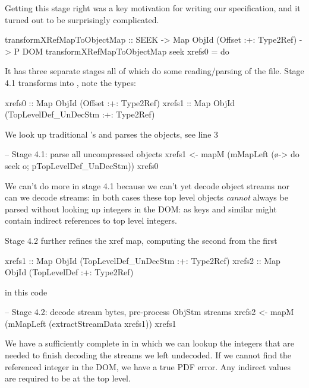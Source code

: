 Getting this stage right was a key motivation for writing our
specification, and it turned out to be surprisingly complicated.
\begin{code}
transformXRefMapToObjectMap
  :: SEEK -> Map ObjId (Offset :+: Type2Ref) -> P DOM
transformXRefMapToObjectMap seek xrefs0 = do
\end{code}
It has three separate stages all of which do some reading/parsing of
the file. Stage 4.1
transforms  into , note the types:
\begin{codeNoExecute}
  xrefs0 :: Map ObjId (Offset               :+: Type2Ref) 
  xrefs1 :: Map ObjId (TopLevelDef_UnDecStm :+: Type2Ref)
\end{codeNoExecute}
%
We look up traditional 's and parses the objects,
see line 3
\begin{code}
    -- Stage 4.1: parse all uncompressed objects
    xrefs1 <- mapM
                (mMapLeft (\o-> do {seek o; pTopLevelDef_UnDecStm}))
                xrefs0
\end{code}
We can't do more in stage 4.1 because we can't yet decode
object streams nor can we decode streams: in both cases these top
level objects \emph{cannot} always be parsed without looking up
integers in the DOM: as  keys and similar might contain
indirect references to top level integers.

Stage 4.2 further refines the xref map, computing the second from the first
\begin{codeNoExecute}
  xrefs1 :: Map ObjId (TopLevelDef_UnDecStm :+: Type2Ref)
  xrefs2 :: Map ObjId (TopLevelDef          :+: Type2Ref) 
\end{codeNoExecute}
in this code
\begin{code}
    -- Stage 4.2: decode stream bytes, pre-process ObjStm streams
    xrefs2 <- mapM
                (mMapLeft (extractStreamData xrefs1))
                xrefs1
\end{code}
We have a sufficiently complete  in  in which
we can lookup the integers that are needed to finish decoding the
streams we left undecoded.
If we cannot find the referenced integer in the DOM, we have a true PDF
error.  Any indirect  values are required to be at the
top level.

